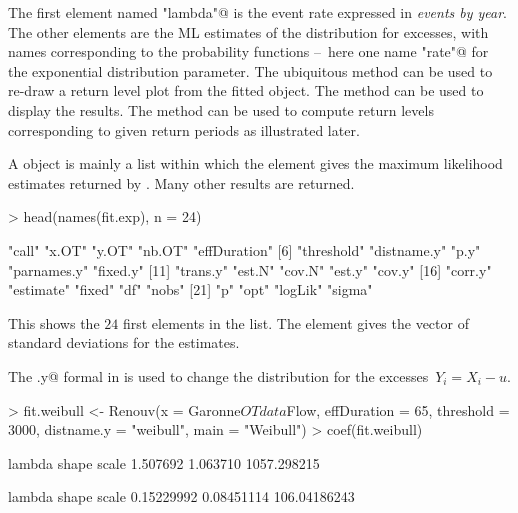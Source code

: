 \documentclass[a4paper]{report}
\begin{document}
\noindent
The first element named \verb@"lambda"@
is the event rate expressed in \textit{events by year}. The other elements are the ML
estimates of the distribution for excesses, with names
corresponding to the probability functions --~here one name
\verb@"rate"@ for the exponential distribution parameter.
The ubiquitous
\verb@plot@ method can be used to re-draw a return level plot 
from the fitted object. The \verb@summary@ method can be used to display the results.
The \verb@predict@ method can be used to compute
return levels corresponding to given return periods as illustrated later.


A \verb@Renouv@ object is mainly a list within which the
\verb@estimate@ element gives the maximum likelihood estimates
returned by \verb@coef@. Many other results are returned.

\begin{Schunk}
\begin{Sinput}
> head(names(fit.exp), n = 24)
\end{Sinput}
\begin{Soutput}
 [1] "call"        "x.OT"        "y.OT"        "nb.OT"       "effDuration"
 [6] "threshold"   "distname.y"  "p.y"         "parnames.y"  "fixed.y"    
[11] "trans.y"     "est.N"       "cov.N"       "est.y"       "cov.y"      
[16] "corr.y"      "estimate"    "fixed"       "df"          "nobs"       
[21] "p"           "opt"         "logLik"      "sigma"      
\end{Soutput}
\end{Schunk}

\noindent
This shows the $24$ first elements in the list. The \verb@sigma@ element gives the
vector of standard deviations for the estimates.

The \verb@distname.y@ formal in \verb@Renouv@ 
is used to change the distribution for the excesses~$Y_i=X_i-u$.
\begin{Schunk}
\begin{Sinput}
> fit.weibull <- Renouv(x = Garonne$OTdata$Flow, effDuration = 65, threshold = 3000,
                        distname.y = "weibull", main = "Weibull")
> coef(fit.weibull)
\end{Sinput}
\begin{Soutput}
     lambda       shape       scale 
   1.507692    1.063710 1057.298215 
\end{Soutput}
\begin{Soutput}
      lambda        shape        scale 
  0.15229992   0.08451114 106.04186243 
\end{Soutput}
\end{Schunk}
\end{document}
